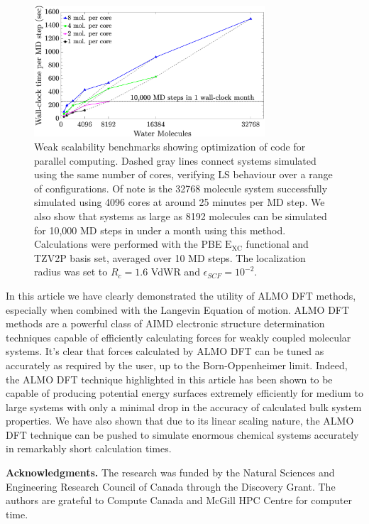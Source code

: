 \documentclass[10pt,aps,prl,twocolumn,amsmath,amssymb,superscriptaddress,longbibliography]{revtex4-1}
\begin{document}

\begin{figure}
\includegraphics[trim={1.6cm 0cm 4.7cm 0cm},clip,width=8.6cm]{weakscaling.eps}
\caption{\label{fig:weakscaling} Weak scalability benchmarks showing optimization of code for parallel computing.
Dashed gray lines connect systems simulated using the same number of cores, verifying LS behaviour over a range of configurations.
Of note is the 32768 molecule system successfully simulated using 4096 cores at around 25 minutes per MD step.
We also show that systems as large as 8192 molecules can be simulated for 10,000 MD steps in under a month using this method.
Calculations were performed with the PBE $\mathrm{E_{XC}}$ functional and TZV2P basis set, averaged over 10 MD steps. 
The localization radius was set to $R_{c} = 1.6$ VdWR and $\epsilon_{SCF} = 10^{-2}$.}
\end{figure}


In this article we have clearly demonstrated the utility of ALMO DFT methods, especially when combined with the Langevin Equation of motion.
ALMO DFT methods are a powerful class of AIMD electronic structure determination techniques capable of efficiently calculating forces for weakly coupled molecular systems.
It's clear that forces calculated by ALMO DFT can be tuned as accurately as required by the user, up to the Born-Oppenheimer limit.
Indeed, the ALMO DFT technique highlighted in this article has been shown to be capable of producing potential energy surfaces extremely efficiently for medium to large systems with only a minimal drop in the accuracy of calculated bulk system properties.
We have also shown that due to its linear scaling nature, the ALMO DFT technique can be pushed to simulate enormous chemical systems accurately in remarkably short calculation times.

\textbf{Acknowledgments.} The research was funded by the Natural Sciences and Engineering Research Council of Canada through the Discovery Grant. The authors are grateful to Compute Canada and McGill HPC Centre for computer time.



\end{document}

